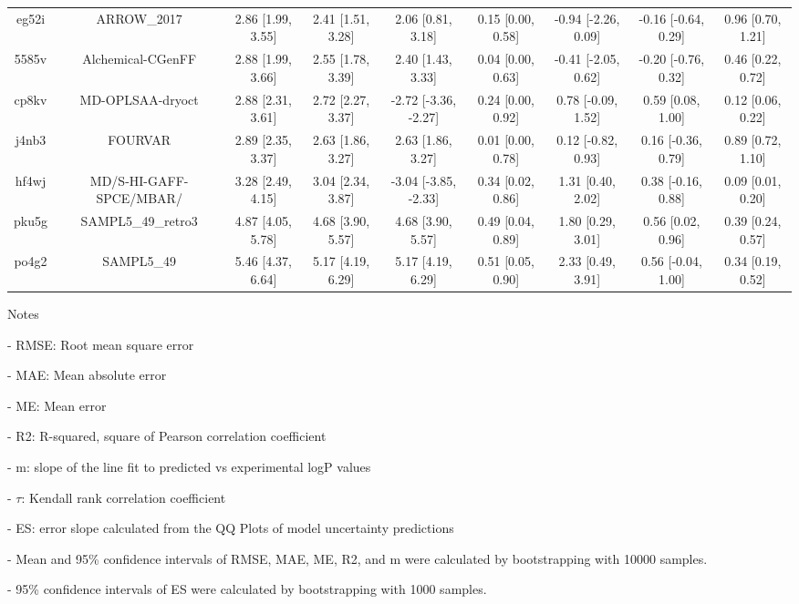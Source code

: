 \documentclass{article}
\begin{document}
\begin{center}
\begin{longtable}{|ccccccccc|}
 eg52i &                                        ARROW\_2017 &  2.86 [1.99, 3.55] &  2.41 [1.51, 3.28] &     2.06 [0.81, 3.18] &  0.15 [0.00, 0.58] &  -0.94 [-2.26, 0.09] &  -0.16 [-0.64, 0.29] &     0.96 [0.70, 1.21] \\
 5585v &                                  Alchemical-CGenFF &  2.88 [1.99, 3.66] &  2.55 [1.78, 3.39] &     2.40 [1.43, 3.33] &  0.04 [0.00, 0.63] &  -0.41 [-2.05, 0.62] &  -0.20 [-0.76, 0.32] &     0.46 [0.22, 0.72] \\
 cp8kv &                                   MD-OPLSAA-dryoct &  2.88 [2.31, 3.61] &  2.72 [2.27, 3.37] &  -2.72 [-3.36, -2.27] &  0.24 [0.00, 0.92] &   0.78 [-0.09, 1.52] &    0.59 [0.08, 1.00] &     0.12 [0.06, 0.22] \\
 j4nb3 &                                            FOURVAR &  2.89 [2.35, 3.37] &  2.63 [1.86, 3.27] &     2.63 [1.86, 3.27] &  0.01 [0.00, 0.78] &   0.12 [-0.82, 0.93] &   0.16 [-0.36, 0.79] &     0.89 [0.72, 1.10] \\
 hf4wj &                            MD/S-HI-GAFF-SPCE/MBAR/ &  3.28 [2.49, 4.15] &  3.04 [2.34, 3.87] &  -3.04 [-3.85, -2.33] &  0.34 [0.02, 0.86] &    1.31 [0.40, 2.02] &   0.38 [-0.16, 0.88] &     0.09 [0.01, 0.20] \\
 pku5g &                                 SAMPL5\_49\_retro3 &  4.87 [4.05, 5.78] &  4.68 [3.90, 5.57] &     4.68 [3.90, 5.57] &  0.49 [0.04, 0.89] &    1.80 [0.29, 3.01] &    0.56 [0.02, 0.96] &     0.39 [0.24, 0.57] \\
 po4g2 &                                         SAMPL5\_49 &  5.46 [4.37, 6.64] &  5.17 [4.19, 6.29] &     5.17 [4.19, 6.29] &  0.51 [0.05, 0.90] &    2.33 [0.49, 3.91] &   0.56 [-0.04, 1.00] &     0.34 [0.19, 0.52] \\
\end{longtable}
\end{center}

Notes

- RMSE: Root mean square error

- MAE: Mean absolute error

- ME: Mean error

- R2: R-squared, square of Pearson correlation coefficient

- m: slope of the line fit to predicted vs experimental logP values

- $\tau$:  Kendall rank correlation coefficient

- ES: error slope calculated from the QQ Plots of model uncertainty predictions

- Mean and 95\% confidence intervals of RMSE, MAE, ME, R2, and m were calculated by bootstrapping with 10000 samples.

- 95\% confidence intervals of ES were calculated by bootstrapping with 1000 samples.\end{document}
\end{document}
